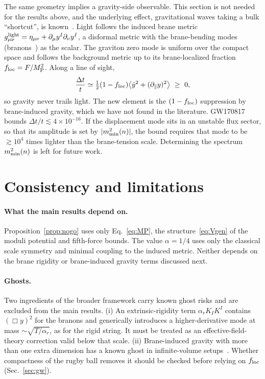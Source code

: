 \documentclass[aps,prd,reprint,superscriptaddress,nofootinbib,floatfix]{revtex4-2}
\theoremstyle{definition}
\newcommand{\MP}{M_{\rm P}}
\begin{document}
The same geometry implies a gravity-side observable. This section is not needed for the results above, and the underlying effect, gravitational waves taking a bulk ``shortcut'', is known~\cite{ChungFreese2000,Visinelli2018,LinYuLiu2023,LinYuGong2024}. Light follows the induced brane metric $g^{\rm light}_{\mu\nu}=\eta_{\mu\nu}+\partial_\mu y^I\partial_\nu y^I$, a disformal metric with the brane-bending modes (branons~\cite{Sundrum1999,DobadoMaroto2001}) as the scalar. The graviton zero mode is uniform over the compact space and follows the background metric up to its brane-localized fraction $f_{\rm loc}=F/\MP^2$. Along a line of sight,
\begin{equation}
\frac{\Delta t}{t}\simeq\tfrac12(1-f_{\rm loc})\big\langle\dot y^2+(\partial_\parallel y)^2\big\rangle\ \ge\ 0,
\end{equation}
so gravity never trails light. The new element is the $(1-f_{\rm loc})$ suppression by brane-induced gravity, which we have not found in the literature. GW170817~\cite{GW170817} bounds $\Delta t/t\lesssim4\times10^{-16}$. If the displacement mode sits in an unstable flux sector, so that its amplitude is set by $|m^2_{\rm min}(n)|$, the bound requires that mode to be $\gtrsim10^4$ times lighter than the brane-tension scale. Determining the spectrum $m^2_{\rm min}(n)$ is left for future work.

\section{Consistency and limitations}\label{sec:limits}

\paragraph*{What the main results depend on.} Proposition~\ref{prop:nogo} uses only Eq.~\eqref{eq:MP}, the structure~\eqref{eq:Vgen} of the moduli potential and fifth-force bounds. The value $\alpha=1/4$ uses only the classical scale symmetry and minimal coupling to the induced metric. Neither depends on the brane rigidity or brane-induced gravity terms discussed next.

\paragraph*{Ghosts.} Two ingredients of the broader framework carry known ghost risks and are excluded from the main results. (i) An extrinsic-rigidity term $\alpha_r K_IK^I$ contains $(\Box y)^2$ for the branons and generically introduces a higher-derivative mode at mass $\sim\!\sqrt{T/\alpha_r}$, as for the rigid string. It must be treated as an effective-field-theory correction valid below that scale. (ii) Brane-induced gravity with more than one extra dimension has a known ghost in infinite-volume setups~\cite{DubovskyRubakov2003}. Whether compactness of the rugby ball removes it should be checked before relying on $f_{\rm loc}$ (Sec.~\ref{sec:gw}).
\end{document}
